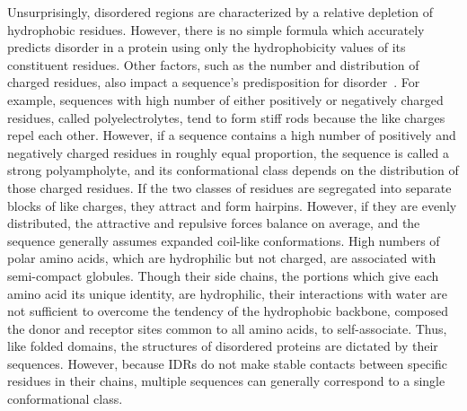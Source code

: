 Unsurprisingly, disordered regions are characterized by a relative depletion of hydrophobic residues. However, there is no simple formula which accurately predicts disorder in a protein using only the hydrophobicity values of its constituent residues. Other factors, such as the number and distribution of charged residues, also impact a sequence's predisposition for disorder~\cite{vanderLee2014, Das2015}. For example, sequences with high number of either positively or negatively charged residues, called polyelectrolytes, tend to form stiff rods because the like charges repel each other. However, if a sequence contains a high number of positively and negatively charged residues in roughly equal proportion, the sequence is called a strong polyampholyte, and its conformational class depends on the distribution of those charged residues. If the two classes of residues are segregated into separate blocks of like charges, they attract and form hairpins. However, if they are evenly distributed, the attractive and repulsive forces balance on average, and the sequence generally assumes expanded coil-like conformations. High numbers of polar amino acids, which are hydrophilic but not charged, are associated with semi-compact globules. Though their side chains, the portions which give each amino acid its unique identity, are hydrophilic, their interactions with water are not sufficient to overcome the tendency of the hydrophobic backbone, composed the donor and receptor sites common to all amino acids, to self-associate. Thus, like folded domains, the structures of disordered proteins are dictated by their sequences. However, because IDRs do not make stable contacts between specific residues in their chains, multiple sequences can generally correspond to a single conformational class.

